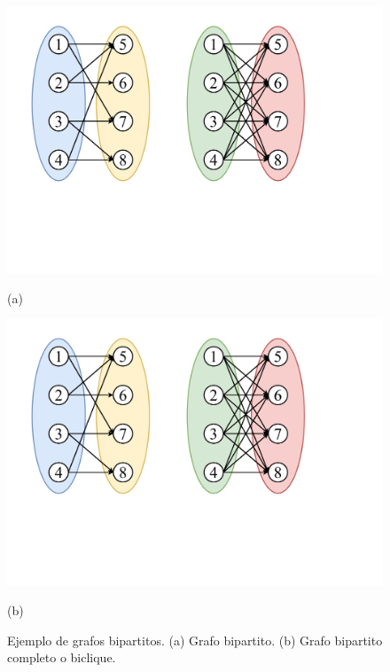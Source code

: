 \begin{figure}[b]
    	\centering
    	\begin{minipage}{0.45\textwidth}
    		\centering
    		\includegraphics[scale=.3, clip,  trim=50 200 520 30]{img/graphs-bipartito.pdf}
    		
    		(a)
    	\end{minipage}
    	\begin{minipage}{0.45\textwidth}
    		\centering
    		\includegraphics[scale=.3, clip, trim=400 200 170 30]{img/graphs-bipartito.pdf}
    		
    		(b)
    	\end{minipage}

    \caption{Ejemplo de grafos bipartitos. (a) Grafo bipartito. (b) Grafo bipartito completo o biclique.}
    \label{fig:bipartito}
\end{figure}
